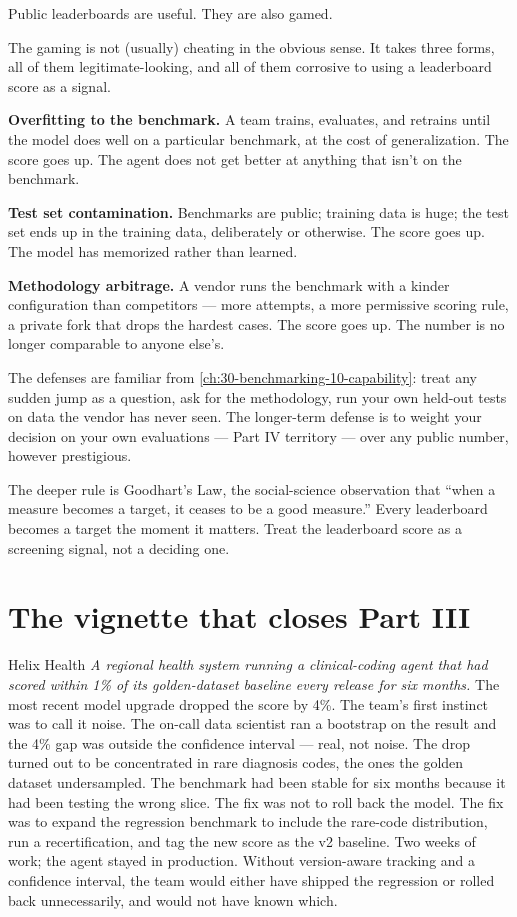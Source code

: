 Public leaderboards are useful. They are also gamed.

The gaming is not (usually) cheating in the obvious sense. It takes three forms, all of them legitimate-looking, and all of them corrosive to using a leaderboard score as a signal.

\textbf{Overfitting to the benchmark.} A team trains, evaluates, and retrains until the model does well on a particular benchmark, at the cost of generalization. The score goes up. The agent does not get better at anything that isn't on the benchmark.

\textbf{Test set contamination.} Benchmarks are public; training data is huge; the test set ends up in the training data, deliberately or otherwise. The score goes up. The model has memorized rather than learned.

\textbf{Methodology arbitrage.} A vendor runs the benchmark with a kinder configuration than competitors --- more attempts, a more permissive scoring rule, a private fork that drops the hardest cases. The score goes up. The number is no longer comparable to anyone else's.

The defenses are familiar from \autoref{ch:30-benchmarking-10-capability}: treat any sudden jump as a question, ask for the methodology, run your own held-out tests on data the vendor has never seen. The longer-term defense is to weight your decision on your own evaluations --- Part IV territory --- over any public number, however prestigious.

The deeper rule is Goodhart's Law, the social-science observation that ``when a measure becomes a target, it ceases to be a good measure.'' Every leaderboard becomes a target the moment it matters. Treat the leaderboard score as a screening signal, not a deciding one.

\section{The vignette that closes Part III}

\begin{TNinpractice}{Helix Health} \textit{A regional health system running a clinical-coding agent that had scored within 1\% of its golden-dataset baseline every release for six months.} The most recent model upgrade dropped the score by 4\%. The team's first instinct was to call it noise. The on-call data scientist ran a bootstrap on the result and the 4\% gap was outside the confidence interval --- real, not noise. The drop turned out to be concentrated in rare diagnosis codes, the ones the golden dataset undersampled. The benchmark had been stable for six months because it had been testing the wrong slice. The fix was not to roll back the model. The fix was to expand the regression benchmark to include the rare-code distribution, run a recertification, and tag the new score as the v2 baseline. Two weeks of work; the agent stayed in production. Without version-aware tracking and a confidence interval, the team would either have shipped the regression or rolled back unnecessarily, and would not have known which. \end{TNinpractice}

